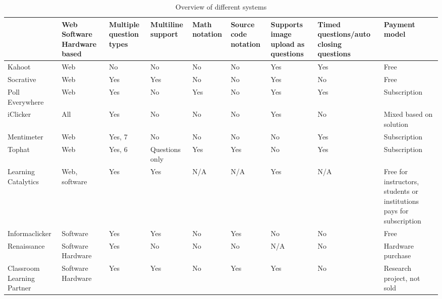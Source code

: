 \begin{landscape}
    \begin{center}
        \begin{table}[H]
            \begin{tabularx}{\paperwidth}{ |X|X|X|X|X|X|X|X|X| } 
             \hline
                 & Web \newline Software \newline Hardware based & Multiple question types & Multiline support & Math notation & Source code notation & Supports image upload as questions & Timed questions/auto closing questions & Payment model \\ \hline
                 
              Kahoot                & Web   & No    & No    & No    & No    & Yes   & Yes   & Free \\ \hline
              Socrative             & Web   & Yes   & Yes   & No    & No    & Yes   & No    & Free \\ \hline
              Poll Everywhere       & Web   & Yes   & No    & Yes   & No    & Yes   & Yes   & Subscription \\ \hline
              iClicker              & All   & Yes   & No    & No    & No    & Yes   & No    & Mixed based on solution \\ \hline
              Mentimeter            & Web   & Yes, 7 & No   & No    & No    & No    & Yes   & Subscription \\ \hline
              Tophat                & Web   & Yes, 6 & Questions only & Yes & Yes   & No    & Yes & Subscription \\ \hline
              Learning Catalytics   & Web, software   & Yes    & Yes  & N/A   & N/A   & Yes   & N/A   & Free for instructors, students or institutions pays for subscription \\ \hline
              Informaclicker        & Software & Yes & Yes  & No & Yes   & No    & No    & Free \\ \hline
              Renaissance           & Software \newline Hardware & Yes & No & No & No & N/A & No & Hardware purchase \\ \hline
              Classroom Learning Partner & Software \newline Hardware & Yes & Yes & No & Yes & Yes & No & Research project, not sold \\
             \hline
            \end{tabularx}
            \caption{Overview of different systems}\label{tab:overview}
        \end{table}
    \end{center}
\end{landscape}





